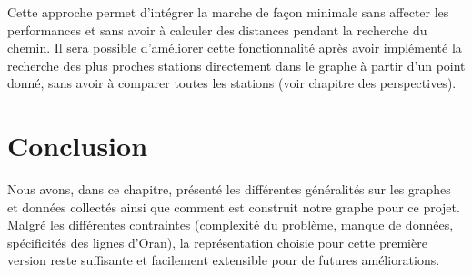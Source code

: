 Cette approche permet d'intégrer la marche de façon minimale sans affecter les performances et sans avoir à calculer des distances pendant la recherche du chemin.
Il sera possible d'améliorer cette fonctionnalité après avoir implémenté la recherche des plus proches stations directement dans le graphe à partir d'un point donné, sans avoir à comparer toutes les stations (voir chapitre des perspectives).

\section{Conclusion}
Nous avons, dans ce chapitre, présenté les différentes généralités sur les graphes et données collectés ainsi que comment est construit notre graphe pour ce projet.
Malgré les différentes contraintes (complexité du problème, manque de données, spécificités des lignes d'Oran), la représentation choisie pour cette première version reste suffisante et facilement extensible pour de futures améliorations.
\newpage
